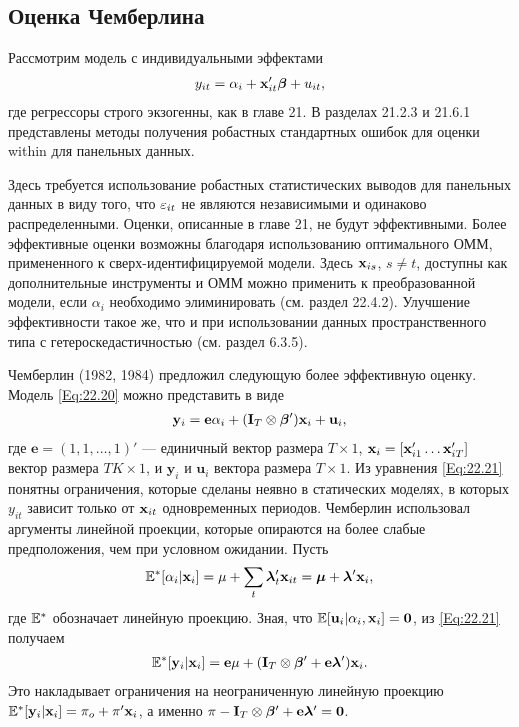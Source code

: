 \subsection{Оценка Чемберлина}

Рассмотрим модель с индивидуальными эффектами
\begin{align}
y_{it}=\alpha_i +\mathbf{x}'_{it}\bm{\beta} +u_{it},
\label{Eq:22.20}
\end{align}
где регрессоры строго экзогенны, как в главе 21. В разделах 21.2.3 и 21.6.1 представлены методы получения робастных стандартных ошибок для оценки within для панельных данных.

Здесь требуется использование робастных статистических выводов для панельных данных в виду того, что $\varepsilon_{it}$ не являются независимыми и одинаково распределенными. Оценки, описанные в главе 21, не будут эффективными. Более эффективные оценки возможны благодаря использованию оптимального ОММ, примененного к сверх-идентифицируемой модели. Здесь $\mathbf{x}_{is}$, $s \neq t$, доступны как дополнительные инструменты и ОММ можно применить к преобразованной модели, если $\alpha_i$ необходимо элиминировать (см. раздел 22.4.2). Улучшение эффективности такое же, что и при использовании данных пространственного типа с гетероскедастичностью (см. раздел 6.3.5).

Чемберлин (1982, 1984) предложил следующую более эффективную оценку. Модель  \ref{Eq:22.20} можно представить в виде 
\begin{align}
\mathbf y_{i}=\mathbf e \alpha_i + (\mathbf I_T \otimes \bm{\beta}')\mathbf{x}_i+\mathbf u_i,
\label{Eq:22.21}
\end{align}
где $\mathbf e=(1, 1, \dots, 1)'$ --- единичный вектор размера $T \times 1$, $\mathbf{x}_i=[\mathbf{x}'_{i1} \dots \mathbf{x}'_{iT}]$ вектор размера $TK \times 1$, и $\mathbf y_i$ и $\mathbf u_i$ вектора размера $T \times 1$. Из уравнения \ref{Eq:22.21} понятны ограничения, которые сделаны неявно в статических моделях, в которых $y_{it}$ зависит только от $\mathbf{x}_{it}$ одновременных периодов. Чемберлин использовал аргументы линейной проекции, которые опираются на более слабые предположения, чем при условном ожидании. Пусть
\begin{align}
\mathbb{E}^*[\alpha_i| \mathbf{x}_i]=\mu+\sum_t \bm\lambda'_t \mathbf{x}_{it}=\bm\mu + \bm\lambda' \mathbf{x}_i,
\nonumber
\end{align}
где $\mathbb{E}^*$ обозначает линейную проекцию. Зная, что $\mathbb{E}[ \mathbf u_i | \alpha_i, \mathbf{x}_i]=\mathbf 0$, из \ref{Eq:22.21} получаем
\begin{align}
\mathbb{E}^*[\mathbf y_i| \mathbf{x}_i]=\mathbf e \mu+( \mathbf I_T \otimes  \bm{\beta}' +\mathbf e \bm\lambda') \mathbf{x}_i.
\nonumber
\end{align}
Это накладывает ограничения на неограниченную линейную проекцию
$\mathbb{E}^*[\mathbf y_i| \mathbf {\mathbf{x}}_i]=\pi_o + \pi'\mathbf{x}_i$, а именно $\pi-\mathbf I_T \otimes \bm{\beta}' + \mathbf e \bm\lambda'=\mathbf 0$.


